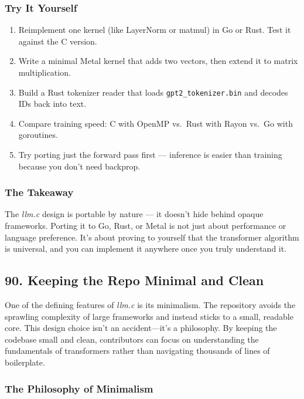\documentclass[
  letterpaper,
  DIV=11,
  numbers=noendperiod]{scrreprt}
\providecommand{\tightlist}{%
  \setlength{\itemsep}{0pt}\setlength{\parskip}{0pt}}
\begin{document}
\subsubsection{Try It Yourself}\label{try-it-yourself-77}

\begin{enumerate}
\def\labelenumi{\arabic{enumi}.}
\tightlist
\item
  Reimplement one kernel (like LayerNorm or matmul) in Go or Rust. Test
  it against the C version.
\item
  Write a minimal Metal kernel that adds two vectors, then extend it to
  matrix multiplication.
\item
  Build a Rust tokenizer reader that loads \texttt{gpt2\_tokenizer.bin}
  and decodes IDs back into text.
\item
  Compare training speed: C with OpenMP vs.~Rust with Rayon vs.~Go with
  goroutines.
\item
  Try porting just the forward pass first --- inference is easier than
  training because you don't need backprop.
\end{enumerate}

\subsubsection{The Takeaway}\label{the-takeaway-78}

The \emph{llm.c} design is portable by nature --- it doesn't hide behind
opaque frameworks. Porting it to Go, Rust, or Metal is not just about
performance or language preference. It's about proving to yourself that
the transformer algorithm is universal, and you can implement it
anywhere once you truly understand it.

\subsection{90. Keeping the Repo Minimal and
Clean}\label{keeping-the-repo-minimal-and-clean}

One of the defining features of \emph{llm.c} is its minimalism. The
repository avoids the sprawling complexity of large frameworks and
instead sticks to a small, readable core. This design choice isn't an
accident---it's a philosophy. By keeping the codebase small and clean,
contributors can focus on understanding the fundamentals of transformers
rather than navigating thousands of lines of boilerplate.

\subsubsection{The Philosophy of
Minimalism}\label{the-philosophy-of-minimalism}
\end{document}
